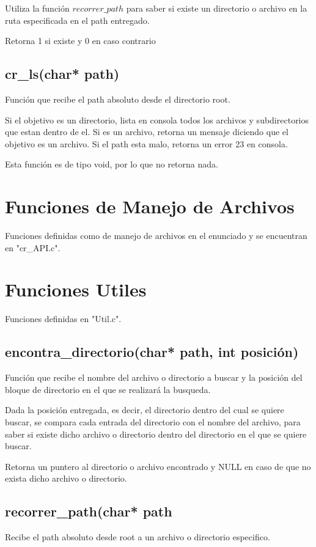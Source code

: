 \documentclass[12pt]{article}
\begin{document}
Utiliza la función $recorrer\_path$ para saber si existe un directorio o archivo en la ruta especificada en el path entregado.

Retorna 1 si existe y 0 en caso contrario

\subsection{cr\_ls(char* path)}
Función que recibe el path absoluto desde el directorio root.

Si el objetivo es un directorio, lista en consola todos los archivos y subdirectorios que estan dentro de el. Si es un archivo, retorna un mensaje diciendo que el objetivo es un archivo. Si el path esta malo, retorna un error 23 en consola.

Esta función es de tipo void, por lo que no retorna nada.



\section{Funciones de Manejo de Archivos}
Funciones definidas como de manejo de archivos en el enunciado y se encuentran en "cr\_API.c".


\section{Funciones Utiles}
Funciones definidas en "Util.c".

\subsection{encontra\_directorio(char* path, int posición)}
Función que recibe el nombre del archivo o directorio a buscar y la posición del bloque de directorio en el que se realizará la busqueda. 

Dada la posición entregada, es decir, el directorio dentro del cual se quiere buscar, se compara cada entrada del directorio con el nombre del archivo, para saber si existe dicho archivo o directorio dentro del directorio en el que se quiere buscar. 

Retorna un puntero al directorio o archivo encontrado y NULL en caso de que no exista dicho archivo o directorio.

\subsection{recorrer\_path(char* path}
Recibe el path absoluto desde root a un archivo o directorio especifico. 
\end{document}
